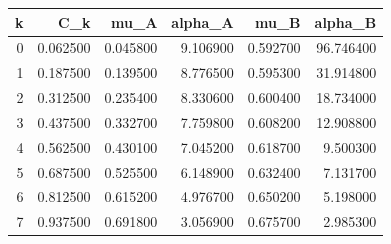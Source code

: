 \begin{tabular}{rrrrrr}
\toprule
k & C_k & mu_A & alpha_A & mu_B & alpha_B \\
\midrule
0 & 0.062500 & 0.045800 & 9.106900 & 0.592700 & 96.746400 \\
1 & 0.187500 & 0.139500 & 8.776500 & 0.595300 & 31.914800 \\
2 & 0.312500 & 0.235400 & 8.330600 & 0.600400 & 18.734000 \\
3 & 0.437500 & 0.332700 & 7.759800 & 0.608200 & 12.908800 \\
4 & 0.562500 & 0.430100 & 7.045200 & 0.618700 & 9.500300 \\
5 & 0.687500 & 0.525500 & 6.148900 & 0.632400 & 7.131700 \\
6 & 0.812500 & 0.615200 & 4.976700 & 0.650200 & 5.198000 \\
7 & 0.937500 & 0.691800 & 3.056900 & 0.675700 & 2.985300 \\
\bottomrule
\end{tabular}
